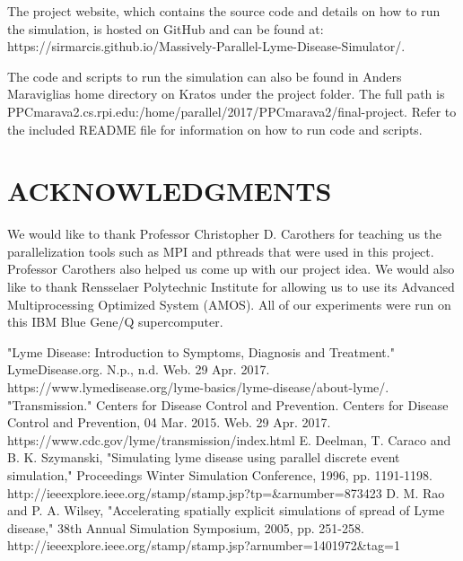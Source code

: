 \documentclass[letterpaper, 10 pt, conference]{ieeeconf}  %
\begin{document}
The project website, which contains the source code and details on how to run the simulation, is hosted on GitHub and can be found at: https://sirmarcis.github.io/Massively-Parallel-Lyme-Disease-Simulator/.

The code and scripts to run the simulation can also be found in Anders Maraviglia\textquotesingle s home directory on Kratos under the project folder.  The full path is PPCmarava2\@kratos.cs.rpi.edu:/home/parallel/2017/PPCmarava2/final-project.  Refer to the included README file for information on how to run code and scripts.

\section*{ACKNOWLEDGMENTS}

We would like to thank Professor Christopher D. Carothers for teaching us the parallelization tools such as MPI and pthreads that were used in this project.  Professor Carothers also helped us come up with our project idea.  We would also like to thank Rensselaer Polytechnic Institute for allowing us to use its Advanced Multiprocessing Optimized System (AMOS).  All of our experiments were run on this IBM Blue Gene/Q supercomputer.

\begin{thebibliography}{99}

 "Lyme Disease: Introduction to Symptoms, Diagnosis and Treatment." LymeDisease.org. N.p., n.d. Web. 29 Apr. 2017. https://www.lymedisease.org/lyme-basics/lyme-disease/about-lyme/.
 "Transmission." Centers for Disease Control and Prevention. Centers for Disease Control and Prevention, 04 Mar. 2015. Web. 29 Apr. 2017. https://www.cdc.gov/lyme/transmission/index.html
 E. Deelman, T. Caraco and B. K. Szymanski, "Simulating lyme disease using parallel discrete event simulation," Proceedings Winter Simulation Conference, 1996, pp. 1191-1198. http://ieeexplore.ieee.org/stamp/stamp.jsp?tp=\&arnumber=873423
 D. M. Rao and P. A. Wilsey, "Accelerating spatially explicit simulations of spread of Lyme disease," 38th Annual Simulation Symposium, 2005, pp. 251-258. 
http://ieeexplore.ieee.org/stamp/stamp.jsp?arnumber=1401972\&tag=1



\end{thebibliography}
\end{document}
